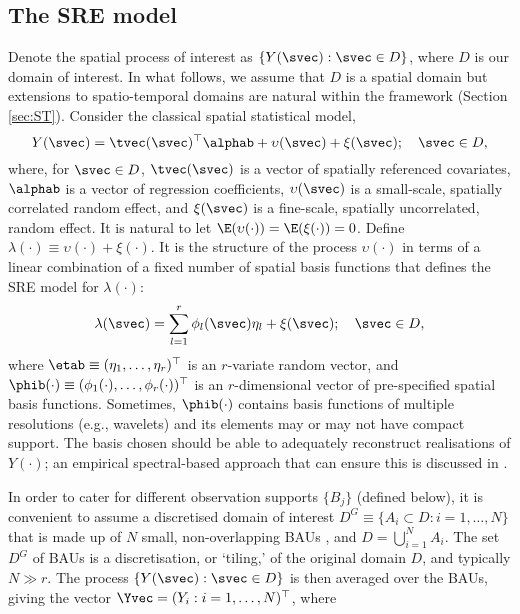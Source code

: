 \subsection{The SRE model} \label{sec:SREModel}

Denote the spatial process of interest as $\{Y(\svec) : \svec \in D\}$, where $D$ is our domain of interest. In what follows, we assume that $D$ is a spatial domain but extensions to spatio-temporal domains are natural within the framework (Section \ref{sec:ST}). Consider the classical spatial statistical model,
\begin{equation*}
Y(\svec) = \tvec(\svec)^\top\alphab + \upsilon(\svec) + \xi(\svec); \quad \svec \in D,
\end{equation*}
where, for $\svec \in D$, $\tvec(\svec)$ is a vector of spatially referenced covariates, $\alphab$ is a vector of regression coefficients, $\upsilon(\svec)$ is a small-scale, spatially correlated random effect, and $\xi(\svec)$ is a fine-scale, spatially uncorrelated, random effect. It is natural to let $\E(\upsilon(\cdot)) = \E(\xi(\cdot)) = 0$. Define $\lambda(\cdot) \equiv \upsilon(\cdot) + \xi(\cdot)$. It is the structure of the process $\upsilon(\cdot)$ in terms of a linear combination of a fixed number of spatial basis functions that defines the SRE model for $\lambda(\cdot)$:
$$
\lambda(\svec) = \sum_{l=1}^r \phi_l(\svec)\eta_l + \xi(\svec);\quad \svec \in D,
$$
\noindent where $\etab \equiv (\eta_1,\dots,\eta_r)^\top$ is an $r$-variate random vector, and $\phib(\cdot) \equiv (\phi_1(\cdot),\dots,\phi_r(\cdot))^\top$ is an $r$-dimensional vector of pre-specified spatial basis functions. Sometimes, $\phib(\cdot)$ contains basis functions of multiple resolutions (e.g., wavelets) and its elements may or may not have compact support. The basis chosen should be able to adequately reconstruct realisations of $Y(\cdot)$; an empirical spectral-based approach that can ensure this is discussed in \cite{Zammit_2012}.

In order to cater for different observation supports $\{B_j\}$ (defined below), it is convenient to assume a discretised domain of interest $D^G \equiv \{A_i \subset D: i = 1,\dots,N\}$ that is made up of $N$ small, non-overlapping BAUs \citep{Nguyen_2012}, and $D = \bigcup_{i=1}^N A_i$. The set $D^G$ of BAUs is a discretisation, or `tiling,' of the original domain $D$, and typically $N \gg r$. The process $\{Y(\svec): \svec \in D\}$ is then averaged over the BAUs, giving the vector $\Yvec = (Y_i : i = 1,\dots,N)^\top$, where

